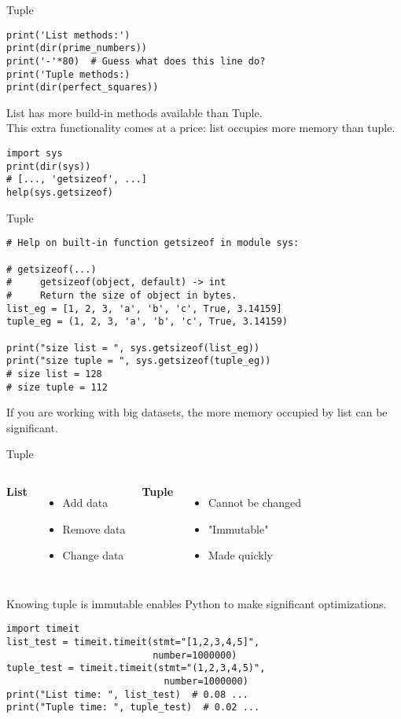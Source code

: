 \documentclass{beamer}
\begin{document}
\begin{frame}[fragile]{Tuple}
\begin{verbatim}
print('List methods:')
print(dir(prime_numbers))
print('-'*80)  # Guess what does this line do?
print('Tuple methods:)
print(dir(perfect_squares))
\end{verbatim}
List has more build-in methods available than Tuple.\\
This extra functionality comes at a price: list occupies more
memory than tuple.
\begin{verbatim}
import sys
print(dir(sys))
# [..., 'getsizeof', ...]
help(sys.getsizeof)
\end{verbatim}
\end{frame}

\begin{frame}[fragile]{Tuple}
\begin{verbatim}
# Help on built-in function getsizeof in module sys:

# getsizeof(...)
#     getsizeof(object, default) -> int
#     Return the size of object in bytes.
list_eg = [1, 2, 3, 'a', 'b', 'c', True, 3.14159]
tuple_eg = (1, 2, 3, 'a', 'b', 'c', True, 3.14159)

print("size list = ", sys.getsizeof(list_eg))
print("size tuple = ", sys.getsizeof(tuple_eg))
# size list = 128
# size tuple = 112
\end{verbatim}
If you are working with big datasets, the more memory 
occupied by list can be significant.
\end{frame}

\begin{frame}[fragile]{Tuple}
\begin{columns}[T]
\textbf{List}
\begin{itemize}
\item Add data
\item Remove data
\item Change data
\end{itemize}
\textbf{Tuple}
\begin{itemize}
\item Cannot be changed
\item "Immutable"
\item Made quickly
\end{itemize}
\end{columns}
\vspace{10pt}
Knowing tuple is immutable enables Python to make 
significant optimizations.
\begin{verbatim}
import timeit
list_test = timeit.timeit(stmt="[1,2,3,4,5]", 
                          number=1000000)
tuple_test = timeit.timeit(stmt="(1,2,3,4,5)",
                            number=1000000)
print("List time: ", list_test)  # 0.08 ...
print("Tuple time: ", tuple_test)  # 0.02 ...
\end{verbatim}
\end{frame}
\end{document}
